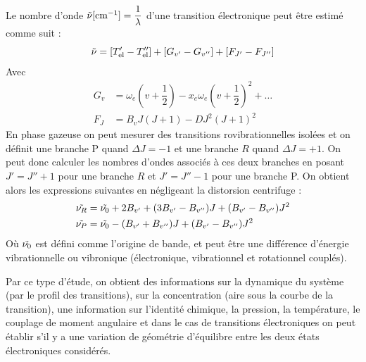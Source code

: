 Le nombre d'onde $\Tilde{\nu}[\si{cm^{-1}}]=\dfrac{1}{\lambda}$ d'une transition électronique peut être estimé comme suit :
\[
\Tilde{\nu} = [T_\text{el}'-T_\text{el}''] + [G_{v'}-G_{v''}] + [F_{J'}-F_{J''}]
\]
Avec
\begin{align*}
    G_v &= \omega_e(v+\dfrac{1}{2})-x_e\omega_e(v+\dfrac{1}{2})^2 + \hdots\\
    F_J &= B_vJ(J+1) - DJ^2(J+1)^2
\end{align*}
En phase gazeuse on peut mesurer des transitions rovibrationnelles isolées et on définit une branche P quand $\Delta J =-1$ et une branche $R$ quand $\Delta J =+1$. On peut donc calculer les nombres d'ondes associés à ces deux branches en posant $J' = J''+1$ pour une branche $R$ et $J' = J'' - 1$ pour une branche P. On obtient alors les expressions suivantes en négligeant la distorsion centrifuge :
\begin{align*}
    \Tilde{\nu_R} &= \Tilde{\nu_0} + 2B_{v'} + (3B_{v'}-B_{v''})J + (B_{v'}-B_{v''})J^2\\
    \Tilde{\nu_P} &= \Tilde{\nu_0} - (B_{v'}+B_{v''})J + (B_{v'}-B_{v''})J^2
\end{align*}
Où $\Tilde{\nu_0}$ est défini comme l'origine de bande, et peut être une différence d'énergie vibrationnelle ou vibronique (électronique, vibrationnel et rotationnel couplés).


Par ce type d’étude, on obtient des informations sur la dynamique du système (par le profil des transitions), sur la concentration (aire sous la courbe de la transition), une information sur l’identité chimique, la pression, la température, le couplage de moment angulaire et dans le cas de transitions électroniques on peut établir s’il y a une variation de géométrie d’équilibre entre les deux états électroniques considérés.






\clearpage